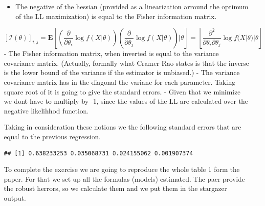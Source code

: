 \documentclass[]{book}
\newenvironment{Shaded}{\begin{snugshade}}{\end{snugshade}}
\newcommand{\KeywordTok}[1]{\textcolor[rgb]{0.13,0.29,0.53}{\textbf{#1}}}
\newcommand{\StringTok}[1]{\textcolor[rgb]{0.31,0.60,0.02}{#1}}
\newcommand{\OperatorTok}[1]{\textcolor[rgb]{0.81,0.36,0.00}{\textbf{#1}}}
\newcommand{\NormalTok}[1]{#1}
\providecommand{\tightlist}{%
  \setlength{\itemsep}{0pt}\setlength{\parskip}{0pt}}
\begin{document}
\begin{itemize}
\tightlist
\item
  The negative of the hessian (provided as a linearization arround the
  optimum of the LL maximization) is equal to the Fisher information
  matrix.
\end{itemize}

\[[\mathcal{I}(\theta)]_{i,j}= \mathbf{E}\left[\left(\frac{\partial}{\partial \theta_i} \log f(X|\theta)\right)\left(\frac{\partial}{\partial \theta_j} \log f(X|\theta)\right)|\theta\right]=\left[\frac{\partial^2}{\partial \theta_i \partial \theta_j} \log f(X|\theta)|\theta\right]\]
- The Fisher information matrix, when inverted is equal to the variance
covariance matrix. (Actually, formally what Cramer Rao states is that
the inverse is the lower bound of the variance if the estimator is
unbiased.) - The variance covariance matrix has in the diagonal the
variane for each parameter. Taking square root of it is going to give
the standard errors. - Given that we minimize we dont have to multiply
by -1, since the values of the LL are calculated over the negative
likelihhod function.

Taking in consideration these notions we the following standard errors
that are equal to the previous regression.

\begin{Shaded}
\end{Shaded}

\begin{verbatim}
## [1] 0.638233253 0.035068731 0.024155062 0.001907374
\end{verbatim}

To complete the exercise we are going to reproduce the whole table 1
form the paper. For that we set up all the formulas (models) estimated.
The paer provide the robust herrors, so we calculate them and we put
them in the stargazer \citep{R-stargazer} output.
\end{document}
